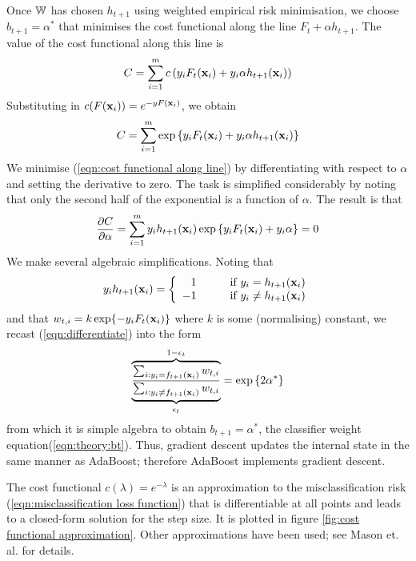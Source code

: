 Once $\mathbb{W}$ has chosen $h_{t+1}$ using weighted empirical risk
minimisation, we choose $b_{t+1} = \alpha^{\ast}$ that minimises the
cost functional along the line $F_t + \alpha h_{t+1}$.  The value of
the cost functional along this line is
%
\begin{equation}
C = \sum_{i=1}^{m} c \left( y_i F_t(\mathbf{x}_i) + y_i \alpha
h_{t+1}(\mathbf{x}_i) \right)
\end{equation}
%
Substituting in $c(F(\mathbf{x}_i)) = e^{-yF(\mathbf{x}_i)}$, we obtain
%
\begin{equation}
C = \sum_{i=1}^{m} \exp \left\{ y_i F_t(\mathbf{x}_i) + y_i \alpha
h_{t+1}(\mathbf{x}_i) \right\}
\label{eqn:cost functional along line}
\end{equation}
%
We minimise (\ref{eqn:cost functional along line}) by
differentiating with respect to $\alpha$ and setting the derivative to
zero.  The task is simplified considerably by noting that only the
second half of the exponential is a function of $\alpha$.  The result
is that
%
\begin{equation}
\label{eqn:differentiate}
\frac{\partial C}{\partial \alpha}
= \sum_{i=1}^{m} y_i h_{t+1}(\mathbf{x}_i) \exp \left\{ y_i F_t(\mathbf{x}_i) +
y_i \alpha \right\} = 0
\end{equation}
%
We make several algebraic simplifications.  Noting that
%
\begin{equation}
y_i h_{t+1}(\mathbf{x}_i) = \left\{ 
	\begin{array}{rl}
	1 &	\qquad \mbox{if $y_i = h_{t+1}(\mathbf{x}_i)$} \\
	-1 &	\qquad \mbox{if $y_i \neq h_{t+1}(\mathbf{x}_i)$}
	\end{array}
\right. 
\end{equation}
%
and that $w_{t,i} = k \exp \{ -y_i F_t(\mathbf{x}_i) \}$ where $k$ is some
(normalising) constant, we recast (\ref{eqn:differentiate}) into
the form 
%
\begin{equation}
\overbrace{
\underbrace{
	\frac{\sum_{i : y_i = f_{t+1}(\mathbf{x}_i)} w_{t,i}}
	     {\sum_{i : y_i \neq f_{t+1}(\mathbf{x}_i)} w_{t,i}}
}_{\epsilon_t}
}^{1 - \epsilon_t}
= \exp \left\{ 2 \alpha^{\ast} \right\} 
\end{equation}
%
from which it is simple algebra to obtain $b_{t+1} = \alpha^{\ast}$,
the classifier weight equation(\ref{eqn:theory:bt}). Thus, gradient
descent updates the internal state in the same manner as AdaBoost;
therefore AdaBoost implements gradient descent. 

The cost functional $c(\lambda) = e^{-\lambda}$ is an approximation to
the misclassification risk (\ref{eqn:misclassification loss function})
that is differentiable at all points and leads to a closed-form
solution for the step size.  It is plotted in figure \ref{fig:cost
functional approximation}.  Other approximations have been used; see
Mason et. al. \cite{Mason99} for details.

